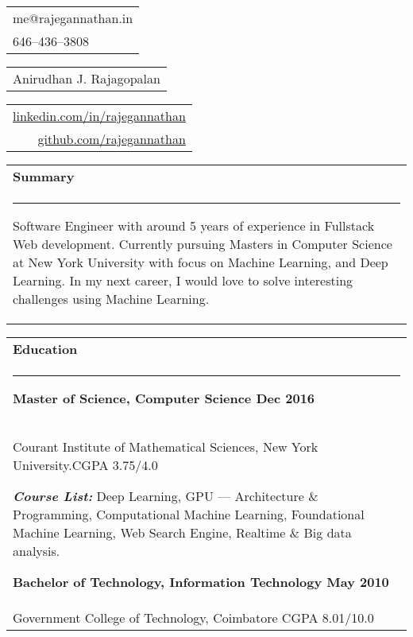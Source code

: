 \documentclass{article}
\begin{document}
{\small\begin{tabular}[c]{l}
	me@rajegannathan.in \\
	646--436--3808
\end{tabular}}\hfill%
{\Large\bfseries\begin{tabular}[c]{c}
	Anirudhan J. Rajagopalan
\end{tabular}}\hfill%
{\small\begin{tabular}[c]{r}
	\href{https://linkedin.com/in/rajegannathan}{linkedin.com/in/rajegannathan} \\
	\href{https://github.com/rajegannathan}{github.com/rajegannathan}
\end{tabular}}%

\bigskip

\begin{tabular}{p{\dimexpr\linewidth-2\tabcolsep}}
	\textbf{\large{Summary}}\\
	\noindent\rule{\textwidth}{0.4pt}
	\begin{adjustwidth}{0.5cm}{0.5cm}
	\small{Software Engineer with around 5 years of experience in Fullstack Web development. Currently pursuing Masters in Computer Science at New York University with focus on Machine Learning, and Deep Learning.  In my next career, I would love to solve interesting challenges using Machine Learning.}
	\end{adjustwidth}
\end{tabular}

\begin{tabular}{p{\dimexpr\linewidth-2\tabcolsep}}
	\textbf{\large{Education}} \\
	\noindent\rule{\textwidth}{0.4pt}
	{\bfseries Master of Science, Computer Science \hfill Dec 2016} \\
	\quad Courant Institute of Mathematical Sciences, New York University.\hfill CGPA 3.75/4.0
	\begin{adjustwidth}{0.375cm}{}
	\textbf{\textit{Course List:}} Deep Learning, GPU --- Architecture \& Programming, Computational Machine Learning, Foundational Machine Learning, Web Search Engine, Realtime \& Big data analysis.
	\end{adjustwidth}

	\smallskip
	{\bfseries Bachelor of Technology, Information Technology \hfill May 2010} \\
	\quad Government College of Technology, Coimbatore \hfill CGPA 8.01/10.0
\end{tabular}

\bigskip
\end{document}
